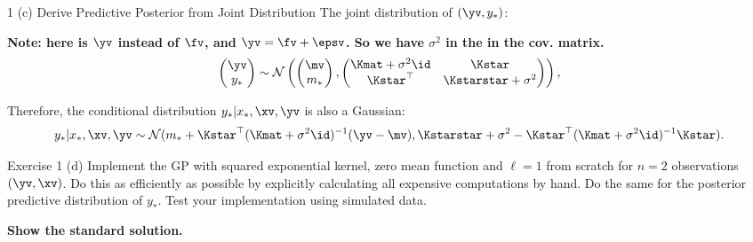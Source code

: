 \documentclass[aspectratio=169]{beamer}
\renewcommand{\N}{\mathcal{N}}
\newcommand{\ys}{y_{*}}
\newcommand{\xs}{x_{*}}
\newcommand{\ms}{m_{*}}
\begin{document}
\begin{frame}{1 (c) Derive Predictive Posterior from Joint Distribution}
	The joint distribution of $(\yv, \ys)$:
	
	\textbf{Note: here is $\yv$ instead of $\fv$, and $\yv = \fv + \epsv$.  So we have $\sigma^2$ in the in the cov. matrix.}
	\begin{align*}
		\begin{pmatrix}
			\yv \\
			\ys 
		\end{pmatrix}
		\sim \N \left(
		\begin{pmatrix}
			\mv \\
			\ms
		\end{pmatrix},
		\begin{pmatrix}
			\Kmat + \sigma^2 \id & \Kstar \\
			\Kstar^\top  & \Kstarstar + \sigma^2 
		\end{pmatrix}
		\right),
	\end{align*}
	
	Therefore, the conditional distribution $\ys | \xs, \xv, \yv $ is also a Gaussian:
	\begin{align*}
		\ys | \xs, \xv, \yv \sim \N(\ms + \Kstar^\top(\Kmat + \sigma^2 \id)^{-1}(\yv -\mv), \Kstarstar + \sigma^2 - \Kstar^\top (\Kmat +\sigma^2 \id)^{-1} \Kstar).
	\end{align*}
\end{frame}

\begin{frame}{Exercise 1 (d)}
	Implement the GP with squared exponential kernel, zero mean function and $\ell = 1$ from scratch for $n=2$ observations $(\yv, \xv)$. Do this as efficiently as possible by explicitly calculating all expensive computations by hand. Do the same for the posterior predictive distribution of $\ys$. Test your implementation using simulated data.
	
	\textbf{Show the standard solution.}
\end{frame}
\end{document}
